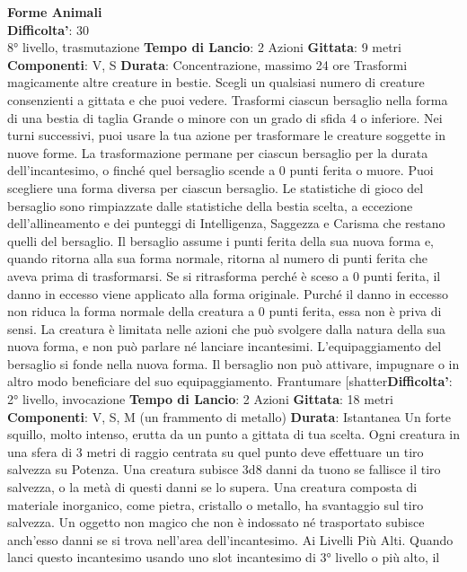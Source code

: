 \begin{multicols}{2}
\medskip\textbf{Forme Animali}\\
\textbf{Difficolta'}: 30\\
8° livello, trasmutazione
\textbf{Tempo di Lancio}: 2 Azioni
\textbf{Gittata}: 9 metri
\textbf{Componenti}: V, S
\textbf{Durata}: Concentrazione, massimo 24 ore
Trasformi magicamente altre creature in bestie. Scegli
un qualsiasi numero di creature consenzienti a gittata e
che puoi vedere. Trasformi ciascun bersaglio nella
forma di una bestia di taglia Grande o minore con un
grado di sfida 4 o inferiore. Nei turni successivi, puoi
usare la tua azione per trasformare le creature soggette
in nuove forme.
La trasformazione permane per ciascun bersaglio per la
durata dell’incantesimo, o finché quel bersaglio scende
a 0 punti ferita o muore. Puoi scegliere una forma
diversa per ciascun bersaglio. Le statistiche di gioco del
bersaglio sono rimpiazzate dalle statistiche della bestia
scelta, a eccezione dell’allineamento e dei punteggi di
Intelligenza, Saggezza e Carisma che restano quelli del
bersaglio. Il bersaglio assume i punti ferita della sua
nuova forma e, quando ritorna alla sua forma normale,
ritorna al numero di punti ferita che aveva prima di
trasformarsi. Se si ritrasforma perché è sceso a 0 punti
ferita, il danno in eccesso viene applicato alla forma
originale. Purché il danno in eccesso non riduca la
forma normale della creatura a 0 punti ferita, essa non
è priva di sensi. La creatura è limitata nelle azioni che
può svolgere dalla natura della sua nuova forma, e non
può parlare né lanciare incantesimi.
L’equipaggiamento del bersaglio si fonde nella nuova
forma. Il bersaglio non può attivare, impugnare o in altro
modo beneficiare del suo equipaggiamento.
Frantumare
[shatter\textbf{Difficolta'}:
2° livello, invocazione
\textbf{Tempo di Lancio}: 2 Azioni
\textbf{Gittata}: 18 metri
\textbf{Componenti}: V, S, M (un frammento di metallo)
\textbf{Durata}: Istantanea
Un forte squillo, molto intenso, erutta da un punto a
gittata di tua scelta. Ogni creatura in una sfera di 3
metri di raggio centrata su quel punto deve effettuare
un tiro salvezza su Potenza. Una creatura subisce
3d8 danni da tuono se fallisce il tiro salvezza, o la metà
di questi danni se lo supera. Una creatura composta di
materiale inorganico, come pietra, cristallo o metallo, ha
svantaggio sul tiro salvezza.
Un oggetto non magico che non è indossato né
trasportato subisce anch’esso danni se si trova
nell’area dell’incantesimo.
Ai Livelli Più Alti. Quando lanci questo incantesimo
usando uno slot incantesimo di 3° livello o più alto, il

\end{multicols}
